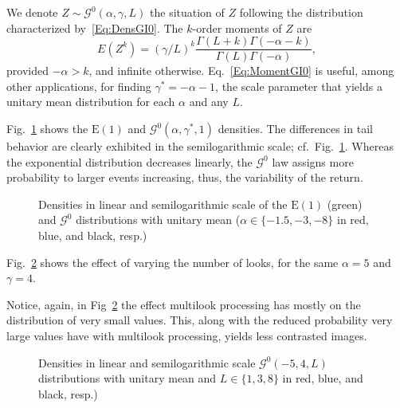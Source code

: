 We denote $Z\sim \mathcal G^0(\alpha,\gamma,L)$ the situation of $Z$ following the distribution characterized by~\eqref{Eq:DensGI0}.
The $k$-order moments of $Z$ are
\begin{equation}
E(Z^k) = (\gamma / L)^{k} \frac{\Gamma(L+k)\Gamma(-\alpha-k)}{\Gamma(L)\Gamma(-\alpha)},
\label{Eq:MomentGI0}
\end{equation}
provided $-\alpha>k$, and infinite otherwise.
Eq.~\eqref{Eq:MomentGI0} is useful, among other applications, for finding $\gamma^*=-\alpha-1$, the scale parameter that yields a unitary mean distribution for each $\alpha$ and any $L$.

Fig.~\ref{Fig:GI0Distribution} shows the $\text{E}(1)$ and $\mathcal G^0(\alpha,\gamma^*, 1)$ densities.
The differences in tail behavior are clearly exhibited in the semilogarithmic scale; cf.\ Fig.~\ref{Fig:GI0Distribution}.
Whereas the exponential distribution decreases linearly, the $\mathcal G^0$ law assigns more probability to larger events increasing, thus, the variability of the return.

\begin{figure}[hbt]
\centering
{}
\caption{Densities in linear and semilogarithmic scale of the $\text{E}(1)$ (green) and $\mathcal G^0$ distributions with unitary mean ($\alpha\in\{-1.5,-3,-8\}$ in red, blue, and black, resp.)}\label{Fig:GI0Distribution}
\end{figure}

Fig.~\ref{Fig:GI0DistributionLooks} shows the effect of varying the number of looks, for the same $\alpha=5$ and $\gamma=4$.

Notice, again, in Fig~\ref{Fig:GI0DistributionLooks} the effect multilook processing has mostly on the distribution of very small values.
This, along with the reduced probability very large values have with multilook processing, yields less contrasted images.

\begin{figure}[hbt]
\centering
{}
\caption{Densities in linear and semilogarithmic scale $\mathcal G^0(-5,4,L)$ distributions with unitary mean and $L\in\{1,3,8\}$ in red, blue, and black, resp.)}\label{Fig:GI0DistributionLooks}
\end{figure}

